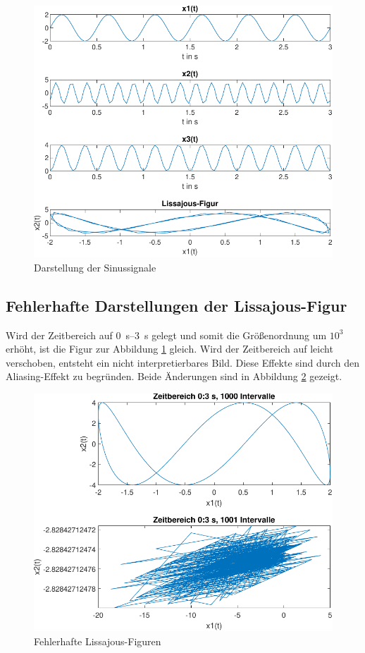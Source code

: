 \documentclass[
    paper=a4,
    fontsize=10pt,
    DIV=13,
    oneside,
]{scrartcl}
\begin{document}
    \begin{figure}[hbt]
        \centering
        \includegraphics[width=\imagewidth]{../versuch1/sinus}
        \caption{Darstellung der Sinussignale}
        \label{fig:sinus}
    \end{figure}

    \subsection{Fehlerhafte Darstellungen der Lissajous-Figur}
        Wird der Zeitbereich auf \SIrange{0}{3}{\second} gelegt und somit die Größenordnung um \(10^3\) erhöht, ist die Figur zur Abbildung \ref{fig:sinus} gleich. Wird der Zeitbereich auf leicht verschoben, entsteht ein nicht interpretierbares Bild. Diese Effekte sind durch den Aliasing-Effekt zu begründen.
        Beide Änderungen sind in Abbildung \ref{fig:lissajous} gezeigt.

        \begin{figure}[hbt]
            \centering
            \includegraphics[width=\imagewidth]{../versuch1/lissjaou}
            \caption{Fehlerhafte Lissajous-Figuren}
            \label{fig:lissajous}
        \end{figure}
\end{document}
